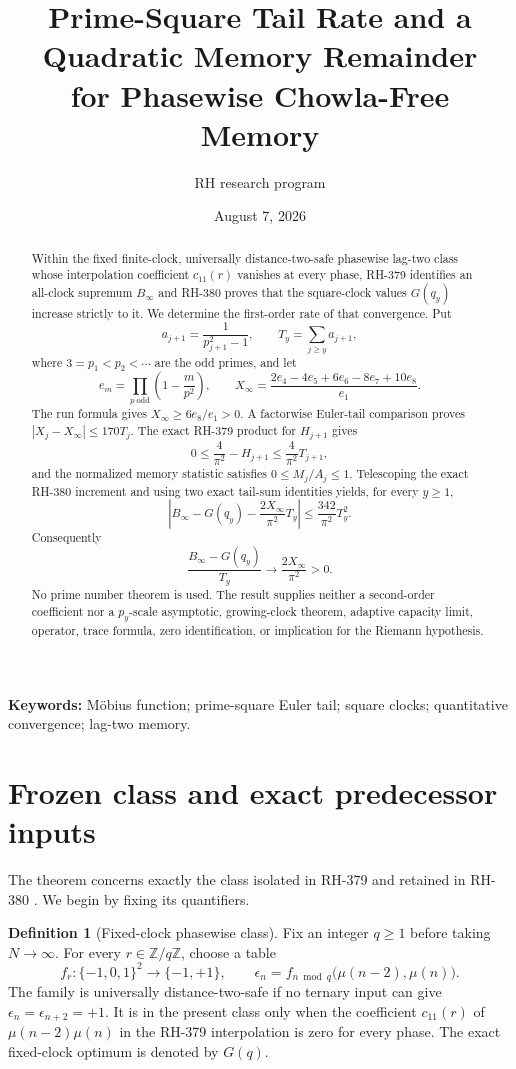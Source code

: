 \documentclass[11pt]{article}
\title{Prime-Square Tail Rate and a Quadratic Memory Remainder\\
for Phasewise Chowla-Free Memory}
\author{RH research program}
\date{August 7, 2026}
\theoremstyle{definition}
\newtheorem{definition}[theorem]{Definition}
\theoremstyle{remark}
\newcommand{\mob}{\mu}
\newcommand{\Z}{\mathbb Z}
\begin{document}
\maketitle

\begin{abstract}
Within the fixed finite-clock, universally distance-two-safe phasewise
lag-two class whose interpolation coefficient $c_{11}(r)$ vanishes at every
phase, RH-379 identifies an all-clock supremum $B_\infty$ and RH-380 proves
that the square-clock values $G(q_y)$ increase strictly to it.  We determine
the first-order rate of that convergence.  Put
\[
 a_{j+1}=\frac1{p_{j+1}^2-1},\qquad
 T_y=\sum_{j\ge y}a_{j+1},
\]
where $3=p_1<p_2<\cdots$ are the odd primes, and let
\[
 e_m=\prod_{p\ \mathrm{odd}}\left(1-\frac m{p^2}\right),\qquad
 X_\infty=\frac{2e_4-4e_5+6e_6-8e_7+10e_8}{e_1}.
\]
The run formula gives $X_\infty\ge6e_8/e_1>0$.  A factorwise Euler-tail
comparison proves $|X_j-X_\infty|\le170T_j$.  The exact RH-379 product for
$H_{j+1}$ gives
\[
 0\le\frac4{\pi^2}-H_{j+1}
 \le\frac4{\pi^2}T_{j+1},
\]
and the normalized memory statistic satisfies $0\le M_j/A_j\le1$.
Telescoping the exact RH-380 increment and using two exact tail-sum
identities yields, for every $y\ge1$,
\[
 \left|B_\infty-G(q_y)-\frac{2X_\infty}{\pi^2}T_y\right|
 \le \frac{342}{\pi^2}T_y^2.
\]
Consequently
\[
 \frac{B_\infty-G(q_y)}{T_y}\longrightarrow
 \frac{2X_\infty}{\pi^2}>0.
\]
No prime number theorem is used.  The result supplies neither a second-order
coefficient nor a $p_y$-scale asymptotic, growing-clock theorem, adaptive
capacity limit, operator, trace formula, zero identification, or implication
for the Riemann hypothesis.
\end{abstract}

\noindent\textbf{Keywords:} M\"obius function; prime-square Euler tail;
square clocks; quantitative convergence; lag-two memory.

\section{Frozen class and exact predecessor inputs}

The theorem concerns exactly the class isolated in RH-379 and retained in
RH-380 \cite{RH379,RH380}.  We begin by fixing its quantifiers.

\begin{definition}[Fixed-clock phasewise class]
Fix an integer $q\ge1$ before taking $N\to\infty$.  For every
$r\in\Z/q\Z$, choose a table
\[
 f_r:\{-1,0,1\}^2\longrightarrow\{-1,+1\},\qquad
 \epsilon_n=f_{n\bmod q}\bigl(\mob(n-2),\mob(n)\bigr).
\]
The family is universally distance-two-safe if no ternary input can give
$\epsilon_n=\epsilon_{n+2}=+1$.  It is in the present class only when the
coefficient $c_{11}(r)$ of $\mob(n-2)\mob(n)$ in the RH-379 interpolation is
zero for every phase.  The exact fixed-clock optimum is denoted by $G(q)$.
\end{definition}
\end{document}
